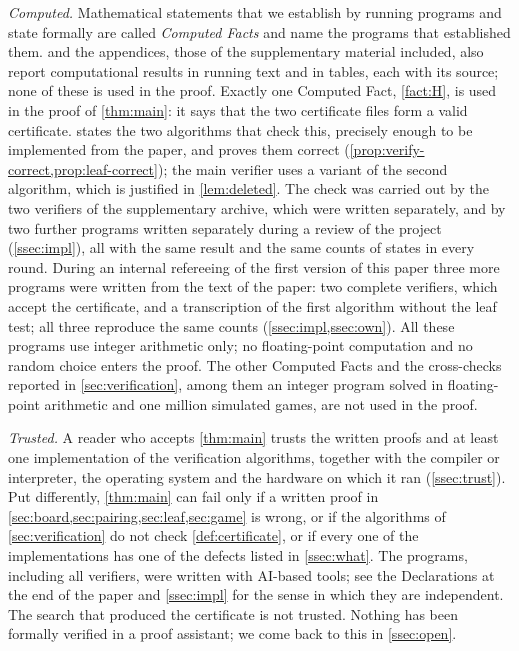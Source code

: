 \emph{Computed.} Mathematical statements that we establish by running programs and state formally are
called \emph{Computed Facts} and name the programs that established them.
 and the appendices, those of the supplementary material
included, also report computational results in running text and in tables, each with its source; none
of these is used in the proof. Exactly one
Computed Fact, \cref{fact:H}, is used in the proof of
\cref{thm:main}: it says that the two certificate files form a valid certificate. 
states the two algorithms that check this, precisely enough to be implemented from the paper, and
proves them correct (\cref{prop:verify-correct,prop:leaf-correct}); the main verifier uses a variant of
the second algorithm, which is justified in \cref{lem:deleted}. The check was carried out by the two
verifiers of the supplementary archive, which were written separately, and by two further programs
written separately during a review of the project (\cref{ssec:impl}), all with the same result and the
same counts of states in every round. During an internal refereeing of the first version of this paper
three more programs were written from the text of the paper: two complete verifiers, which accept the
certificate, and a transcription of the first algorithm without the leaf test; all three reproduce the
same counts (\cref{ssec:impl,ssec:own}). All these programs use integer
arithmetic only; no floating-point computation and no random choice enters the proof. The other
Computed Facts and the cross-checks reported in \cref{sec:verification}, among them an integer program
solved in floating-point arithmetic and one million simulated games, are not used in the proof.

\emph{Trusted.} A reader who accepts \cref{thm:main} trusts the written proofs and at least one
implementation of the verification algorithms, together with the compiler or interpreter, the
operating system and the hardware on which it ran (\cref{ssec:trust}). Put differently, \cref{thm:main}
can fail only if a written proof in \cref{sec:board,sec:pairing,sec:leaf,sec:game} is wrong, or if the
algorithms of \cref{sec:verification} do not check \cref{def:certificate}, or if every one of the
implementations has one of the defects listed in \cref{ssec:what}. The programs, including all
verifiers, were written with AI-based tools; see the Declarations at the end of the paper and
\cref{ssec:impl} for the sense in which they are independent. The search that produced the
certificate is not trusted. Nothing has been formally verified in a proof assistant; we come back to
this in \cref{ssec:open}.

